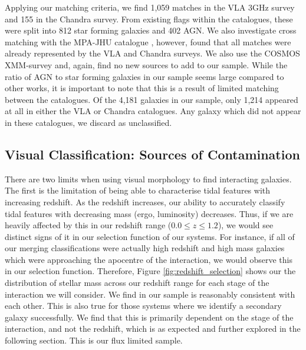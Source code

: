 Applying our matching criteria, we find 1,059 matches in the VLA 3GHz survey and 155 in the Chandra survey. From existing flags within the catalogues, these were split into 812 star forming galaxies and 402 AGN. We also investigate cross matching with the MPA-JHU catalogue \citep{2003MNRAS.341...33K, 2004MNRAS.351.1151B, 2007ApJS..173..267S}, however, found that all matches were already represented by the VLA and Chandra surveys. We also use the COSMOS XMM-survey and, again, find no new sources to add to our sample. While the ratio of AGN to star forming galaxies in our sample seems large compared to other works, it is important to note that this is a result of limited matching between the catalogues. Of the 4,181 galaxies in our sample, only 1,214 appeared at all in either the VLA or Chandra catalogues. Any galaxy which did not appear in these catalogues, we discard as unclassified. 

\subsection{Visual Classification: Sources of Contamination} %

\noindent There are two limits when using visual morphology to find interacting galaxies. The first is the limitation of being able to characterise tidal features with increasing redshift. As the redshift increases, our ability to accurately classify tidal features with decreasing mass (ergo, luminosity) decreases. Thus, if we are heavily affected by this in our redshift range ($0.0 \leq z \leq 1.2$), we would see distinct signs of it in our selection function of our systems. For instance, if all of our merging classifications were actually high redshift and high mass galaxies which were approaching the apocentre of the interaction, we would observe this in our selection function. Therefore, Figure \ref{fig:redshift_selection} shows our the distribution of stellar mass across our redshift range for each stage of the interaction we will consider. We find in our sample is reasonably consistent with each other. This is also true for those systems where we identify a secondary galaxy successfully. We find that this is primarily dependent on the stage of the interaction, and not the redshift, which is as expected and further explored in the following section. This is our flux limited sample.


